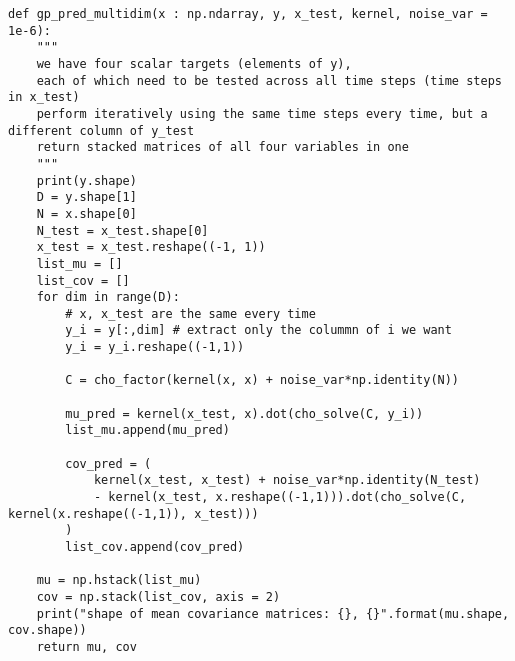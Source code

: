 \documentclass{article}
\begin{document}
\begin{verbatim}
def gp_pred_multidim(x : np.ndarray, y, x_test, kernel, noise_var = 1e-6):
    """
    we have four scalar targets (elements of y),
    each of which need to be tested across all time steps (time steps in x_test)
    perform iteratively using the same time steps every time, but a different column of y_test
    return stacked matrices of all four variables in one
    """
    print(y.shape)
    D = y.shape[1]
    N = x.shape[0]
    N_test = x_test.shape[0]
    x_test = x_test.reshape((-1, 1))
    list_mu = []
    list_cov = []
    for dim in range(D):
        # x, x_test are the same every time
        y_i = y[:,dim] # extract only the colummn of i we want
        y_i = y_i.reshape((-1,1))
        
        C = cho_factor(kernel(x, x) + noise_var*np.identity(N))
        
        mu_pred = kernel(x_test, x).dot(cho_solve(C, y_i))
        list_mu.append(mu_pred)
        
        cov_pred = (
            kernel(x_test, x_test) + noise_var*np.identity(N_test)
            - kernel(x_test, x.reshape((-1,1))).dot(cho_solve(C, kernel(x.reshape((-1,1)), x_test)))
        )
        list_cov.append(cov_pred)
    
    mu = np.hstack(list_mu)
    cov = np.stack(list_cov, axis = 2)
    print("shape of mean covariance matrices: {}, {}".format(mu.shape, cov.shape))
    return mu, cov
\end{verbatim}
\end{document}
